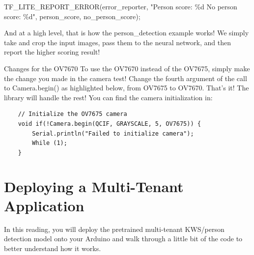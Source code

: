     TF\_LITE\_REPORT\_ERROR(error\_reporter, "Person score: \%d No person score: \%d", person\_score, no\_person\_score);
    
    And at a high level, that is how the person\_detection example works! We simply take and crop the input images, pass them to the neural network, and then report the higher scoring result!
    
    Changes for the OV7670
    To use the OV7670 instead of the OV7675, simply make the change you made in the camera test! Change the fourth argument of the call to Camera.begin() as highlighted below, from OV7675 to OV7670. That’s it! The library will handle the rest! You can find the camera initialization in:
    
  \begin{lstlisting}
    // Initialize the OV7675 camera
    void if(!Camera.begin(QCIF, GRAYSCALE, 5, OV7675)) {
        Serial.println("Failed to initialize camera");
        While (1);
    }    
  \end{lstlisting}    


\section{Deploying a Multi-Tenant Application}
In this reading, you will deploy the pretrained multi-tenant KWS/person detection model onto your Arduino and walk through a little bit of the code to better understand how it works.

